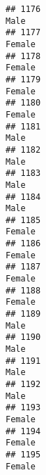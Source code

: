 \documentclass[]{article}
\begin{document}
\begin{verbatim}
## 1176                                                                                                                            Male
## 1177                                                                                                                          Female
## 1178                                                                                                                          Female
## 1179                                                                                                                          Female
## 1180                                                                                                                          Female
## 1181                                                                                                                            Male
## 1182                                                                                                                            Male
## 1183                                                                                                                            Male
## 1184                                                                                                                            Male
## 1185                                                                                                                          Female
## 1186                                                                                                                          Female
## 1187                                                                                                                          Female
## 1188                                                                                                                          Female
## 1189                                                                                                                            Male
## 1190                                                                                                                            Male
## 1191                                                                                                                            Male
## 1192                                                                                                                            Male
## 1193                                                                                                                          Female
## 1194                                                                                                                          Female
## 1195                                                                                                                          Female

\end{verbatim}
\end{document}
